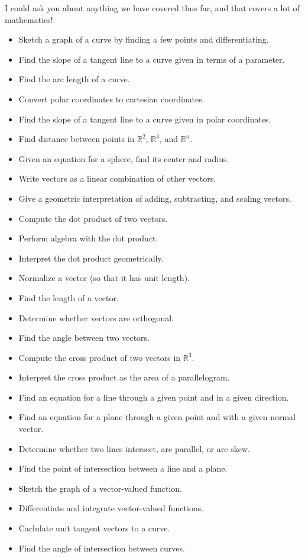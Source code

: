 \documentclass[12pt]{article}
\newcommand{\R}{\mathbb{R}}
\begin{document}
I could ask you about anything we have covered thus far, and that covers a lot of mathematics!
\begin{multicols}{2}
\begin{itemize}
\item Sketch a graph of a curve by finding a few points and differentiating.
\item Find the slope of a tangent line to a curve given
  in terms of a parameter.
\item Find the arc length of a curve.
\item Convert polar coordinates to cartesian coordinates.
\item Find the slope of a tangent line to a curve given in polar coordinates.
\item Find distance between points in $\R^2$, $\R^3$, and $\R^n$.
\item Given an equation for a sphere, find its center and radius.
\item Write vectors as a linear combination of other vectors.
\item Give a geometric interpretation of adding, subtracting, and scaling vectors.
\item Compute the dot product of two vectors.
\item Perform algebra with the dot product.
\item Interpret the dot product geometrically.
\item Normalize a vector (so that it has unit length).
\item Find the length of a vector.
\item Determine whether vectors are orthogonal.
\item Find the angle between two vectors.
\item Compute the cross product of two vectors in $\R^3$.
\item Interpret the cross product as the area of a parallelogram.
\item Find an equation for a line through a given point and in a given direction.
\item Find an equation for a plane through a given point and with a given normal vector.
\item Determine whether two lines intersect, are parallel, or are skew.
\item Find the point of intersection between a line and a plane.
\item Sketch the graph of a vector-valued function.
\item Differentiate and integrate vector-valued functions.
\item Caclulate unit tangent vectors to a curve.
\item Find the angle of intersection between curves.
\end{itemize}
\end{multicols}
\end{document}
